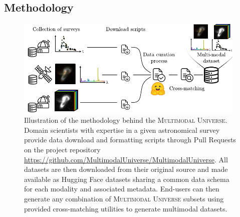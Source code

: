 \documentclass[dvipsnames,table]{article}
\newcommand\pile{\textsc{Multimodal Universe}\xspace}
\begin{document}
\subsection{Methodology}

\begin{figure}
    \centering
    \includegraphics[width=0.98\textwidth]{paper/figures/astropile_data_processing.pdf}
    \caption{\small Illustration of the methodology behind the \pile. Domain scientists with expertise in a given astronomical survey provide data download and formatting scripts through Pull Requests on the project repository \url{https://github.com/MultimodalUniverse/MultimodalUniverse}. All datasets are then downloaded from their original source and made available as Hugging Face datasets sharing a common data schema for each modality and associated metadata. End-users can then generate any combination of \pile subsets using provided cross-matching utilities to generate multimodal datasets.}
    \label{fig:methodology}
\end{figure}

\end{document}
